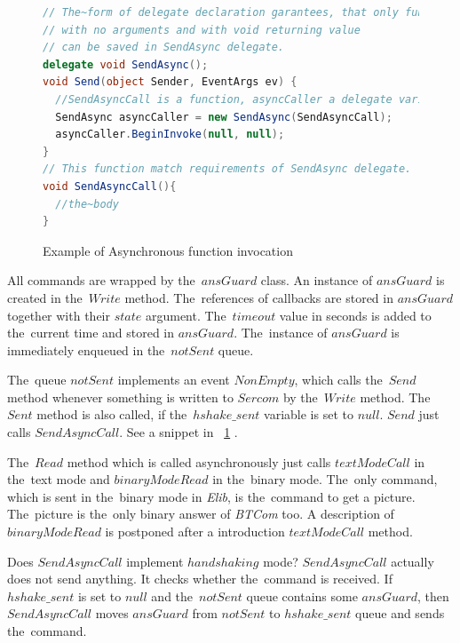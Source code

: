 \begin{figure}[!hbp]
\begin{lstlisting}[language=cs]
// The~form of delegate declaration garantees, that only functions
// with no arguments and with void returning value 
// can be saved in SendAsync delegate.
delegate void SendAsync();
void Send(object Sender, EventArgs ev) {
  //SendAsyncCall is a function, asyncCaller a delegate variable
  SendAsync asyncCaller = new SendAsync(SendAsyncCall);
  asyncCaller.BeginInvoke(null, null);      
}
// This function match requirements of SendAsync delegate.
void SendAsyncCall(){
  //the~body
}
\end{lstlisting}
\caption{Example of Asynchronous function invocation}\label{invocation}
\end{figure}

  All commands are wrapped by the~$ansGuard$ class. An instance of $ansGuard$ is created in the~$Write$ method.
  The~references of callbacks are stored in $ansGuard$ together with their $state$ argument.  
  The~$timeout$ value in seconds is added to the~current time and stored in $ansGuard$.
  The~instance of $ansGuard$ is immediately enqueued in the~$notSent$ queue.

  The~queue $notSent$ implements an event $NonEmpty$, which calls the~$Send$ method whenever something is written
  to $Sercom$ by the~$Write$ method. The~$Sent$ method is also called, if the~$hshake\_sent$ variable is set to $null$.
  $Send$ just calls $SendAsyncCall$. See a snippet in ~\ref{invocation} .

  The~$Read$ method which is called asynchronously just calls $textModeCall$
  in the~text mode and $binaryModeRead$ in the~binary mode.
  The~only command, which is sent in the~binary mode in {\it Elib}, is the~command to get a picture.
  The~picture is the~only binary answer of {\it BTCom} too.
  A description of $binaryModeRead$ is postponed after  
  a introduction $textModeCall$ method.

  Does $SendAsyncCall$ implement $handshaking$ mode?
  $SendAsyncCall$ actually does not send anything. It checks whether the~command is received. 
  If $hshake\_sent$ is set to $null$ and the~$notSent$ queue
  contains some $ansGuard$, then $SendAsyncCall$ moves $ansGuard$ from $notSent$ to $hshake\_sent$
  queue and sends the~command. 

